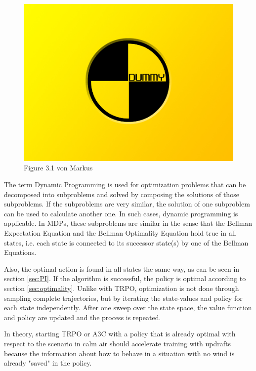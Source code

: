 \begin{figure}[h]
	\includegraphics[width=\textwidth]{src/pics/dummy.jpg}
	\caption{Figure 3.1 von Markus}
	\label{fig:model-based-model-free} 
\end{figure}

The term Dynamic Programming is used for optimization problems that can be decomposed into subproblems and solved by composing the solutions of those subproblems. If the subproblems are very similar, the solution of one subproblem can be used to calculate another one. In such cases, dynamic programming is applicable. In MDPs, these subproblems are similar in the sense that the Bellman Expectation Equation and the Bellman Optimality Equation hold true in all states, i.e. each state is connected to its successor state(s) by one of the Bellman Equations.

Also, the optimal action is found in all states the same way, as can be seen in section \ref{sec:PI}. If the algorithm is successful, the policy is optimal according to section \ref{sec:optimality}. Unlike with TRPO, optimization is not done through sampling complete trajectories, but by iterating the state-values and policy for each state independently. After one sweep over the state space, the value function and policy are updated and the process is repeated.\bigbreak

In theory, starting TRPO or A3C with a policy that is already optimal with respect to the scenario in calm air should accelerate training with updrafts because the information about how to behave in a situation with no wind is already "saved" in the policy.

